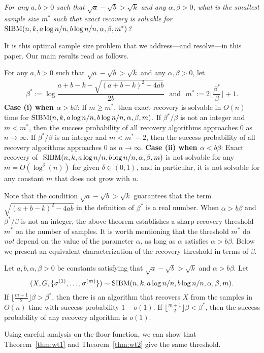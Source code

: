 \documentclass{article}
\begin{document}
\vspace*{.1in}
 \emph{For any $a,b> 0$ such that $\sqrt{a}-\sqrt{b}> \sqrt{k}$ and any $\alpha,\beta>0$, what is the smallest sample size $m^\ast$ such that exact recovery is solvable for $\operatorname{SIBM}(n,k, a\log n/n, b\log n/n,\alpha,\beta,m^\ast)$?}

\vspace*{.1in}  It is this optimal sample size problem that we address---and resolve---in this paper. 
Our main results read as follows.

\begin{theorem} \label{thm:wt1}
For any $a,b> 0$ such that $\sqrt{a}-\sqrt{b}> \sqrt{k}$ and any $\alpha,\beta>0$, let
\begin{equation} \label{eq:defstar}
\beta^\ast := 
\log\frac{a+b-k-\sqrt{(a+b-k)^2-4ab}}{2 b} \text{~~and~~}
m^\ast := 2 \Big\lfloor \frac{\beta^\ast}{\beta} \Big\rfloor +1  .
\end{equation}
{\bf Case (i) when $\alpha>b\beta$}: If $m\ge m^\ast$, then exact recovery is solvable in $O(n)$ time for $\SIBM(n,k, a\log n/n, \linebreak[4] b\log n/n,\alpha,\beta,m)$.
If $\beta^\ast/\beta$ is not an integer and $m < m^*$, then the success probability of all recovery algorithms approaches $0$ as $n\to\infty$. If $\beta^\ast/\beta$ is an integer and $m < m^* - 2$, then the success probability of all recovery algorithms approaches $0$ as $n\to\infty$.
{\bf Case (ii) when $\alpha<b\beta$}: Exact recovery of $~\operatorname{SIBM}(n,k, a\log n/n, b\log n/n,\alpha,\beta,m)$ is not solvable for any $m=O(\log^{\delta}(n))$ for given $\delta \in (0, 1)$, and in particular, it is not solvable for any constant $m$ that does not grow with $n$.
\end{theorem}
Note that the condition $\sqrt{a}-\sqrt{b} > \sqrt{k}$ guarantees that the term $\sqrt{(a+b-k)^2-4ab}$ in the definition of $\beta^\ast$ is a  real number.
When $\alpha>b\beta$ and $\beta^\ast/\beta$ is not an integer,
the above theorem establishes a sharp recovery threshold $m^\ast$ on the number of samples. It is worth mentioning that the threshold $m^\ast$ do {\em not} depend on the value of the parameter $\alpha$, as long as $\alpha$ satisfies $\alpha>b\beta$.
Below we present an equivalent characterization of the recovery threshold in terms of $\beta$.
\begin{theorem} \label{thm:wt2}
	Let $a,b,\alpha,\beta> 0$ be constants satisfying that $\sqrt{a}-\sqrt{b} > \sqrt{k}$ and $\alpha>b\beta$. 
	Let 
	$$
	(X,G,\{\sigma^{(1)},\dots,\sigma^{(m)}\}) \sim \operatorname{SIBM}(n, k, a\log n/n, b\log n/n,\alpha,\beta,m).
	$$
	If $\lfloor \frac{m+1}{2} \rfloor \beta>\beta^\ast$, then there is an algorithm that recovers $X$ from the samples in $O(n)$ time with success probability $1-o(1)$. If $\lfloor \frac{m+1}{2} \rfloor \beta <\beta^\ast$, then the success probability of any recovery algorithm is $o(1)$. 
\end{theorem}
Using careful analysis on the floor function, we can show that Theorem~\ref{thm:wt1} and Theorem~\ref{thm:wt2} give the same threshold.
\end{document}
